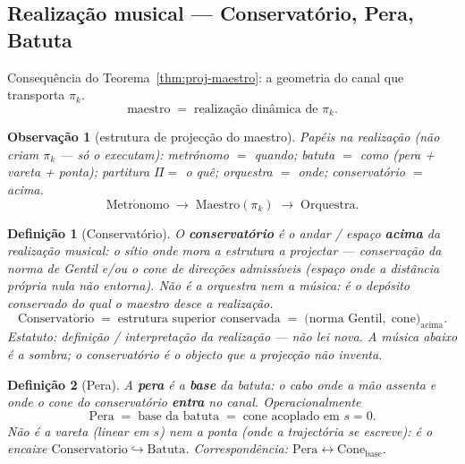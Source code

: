 \documentclass[11pt,a4paper]{article}
\newtheorem{definicao}{Definição}
\newtheorem{observacao}{Observação}
\begin{document}
\subsection*{Realização musical --- Conservatório, Pera, Batuta}

Consequência do Teorema~\ref{thm:proj-maestro}: a geometria do canal
que transporta $\pi_k$.
\[
\boxed{
\mathrm{maestro}
\;=\;
\text{realização dinâmica de }\pi_k.
}
\]

\begin{observacao}[estrutura de projecção do maestro]\label{obs:proj-dinamica}
Papéis na realização (não criam $\pi_k$ --- só o executam):
metrónomo $=$ \emph{quando}; batuta $=$ \emph{como}
(pera + vareta + ponta); partitura $\Pi=$ \emph{o quê}; orquestra $=$
\emph{onde}; conservatório $=$ \emph{acima}.
\[
\boxed{
\mathrm{Metr\acute{o}nomo}
\;\longrightarrow\;
\mathrm{Maestro}(\pi_k)
\;\longrightarrow\;
\mathrm{Orquestra}.
}
\]
\end{observacao}

\begin{definicao}[Conservatório]\label{def:conservatorio}
O \textbf{conservatório} é o andar / espaço \textbf{acima} da realização
musical: o sítio onde mora a estrutura a projectar --- conservação da
norma de Gentil e/ou o cone de direcções admissíveis (espaço onde a
distância própria nula não entorna). Não é a orquestra nem a música:
é o \emph{depósito conservado} do qual o maestro desce a realização.
\[
\boxed{
\mathrm{Conservat\acute{o}rio}
\;=\;
\text{estrutura superior conservada}
\;=\;
\bigl(\text{norma Gentil},\;\text{cone}\bigr)_{\mathrm{acima}}.
}
\]
Estatuto: definição / interpretação da realização --- não lei nova.
A música abaixo é a sombra; o conservatório é o objecto que a projecção
não inventa.
\end{definicao}

\begin{definicao}[Pera]\label{def:pera}
A \textbf{pera} é a \textbf{base} da batuta: o cabo onde a mão assenta
e onde o cone do conservatório \textbf{entra} no canal. Operacionalmente
\[
\boxed{
\mathrm{Pera}
\;=\;
\text{base da batuta}
\;=\;
\text{cone acoplado em }s=0.
}
\]
Não é a vareta (linear em $s$) nem a ponta (onde a trajectória se
escreve): é o encaixe
$\mathrm{Conservat\acute{o}rio}\hookrightarrow\mathrm{Batuta}$.
Correspondência:
$\mathrm{Pera}\leftrightarrow\mathrm{Cone}_{\mathrm{base}}$.
\end{definicao}
\end{document}
